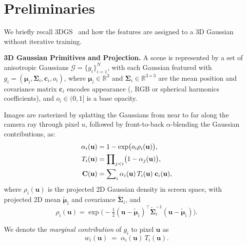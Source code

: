 \section{Preliminaries}
We briefly recall 3DGS~\cite{kerbl20233d} and how the features are assigned to a 3D Gaussian without iterative training.

\textbf{3D Gaussian Primitives and Projection.}
A scene is represented by a set of anisotropic Gaussians $\mathcal{G}=\{g_i\}_{i=1}^N$, with each Gaussian featured with $g_i=(\boldsymbol\mu_i,\mathbf\Sigma_i,\mathbf{c}_i,o_i)$, where $\boldsymbol\mu_i\!\in\!\mathbb{R}^3$ and $\mathbf\Sigma_i\!\in\!\mathbb{R}^{3\times 3}$ are the mean position and covariance matrix $\mathbf{c}_i$ encodes appearance (\eg, RGB or spherical harmonics coefficients), and $o_i\!\in\!(0,1]$ is a base opacity.

Images are rasterized by splatting the Gaussians from near to far along the camera ray through pixel $u$, followed by front-to-back $\alpha$-blending the Gaussian contributions, as:
\begin{align}
\alpha_i(\mathbf{u})
&= 1-\exp\!\big(o_i\rho_i(\mathbf{u})\big),
\label{eq:alpha}
\\
T_i(\mathbf{u})
&= \prod\nolimits_{j<i}\!\big(1-\alpha_j(\mathbf{u})\big),
\hspace{-1em}
\label{eq:transmittance}
\\
\mathbf{C}(\mathbf{u})
&= \sum\nolimits_{i} 
\alpha_i(\mathbf{u})\,T_i(\mathbf{u})
\;\mathbf{c}_i(\mathbf{u}),
\label{eq:composite_color}
\end{align}
where $\rho_i(\mathbf{u})$ is the projected 2D Gaussian density in screen space, with projected 2D mean $\tilde{\boldsymbol\mu}_i$ and covariance $\tilde{\mathbf\Sigma}_i$, and
\begin{equation}
\rho_i(\mathbf{u})
= \exp\!\Big(-\tfrac{1}{2}(\mathbf{u}-\tilde{\boldsymbol\mu}_i)^\top
\tilde{\mathbf\Sigma}_i^{-1}(\mathbf{u}-\tilde{\boldsymbol\mu}_i)\Big).
\end{equation}

We denote the \emph{marginal contribution} of $g_i$ to pixel $\mathbf{u}$ as
\begin{equation}
w_i(\mathbf{u}) \;=\; \alpha_i(\mathbf{u})\,T_i(\mathbf{u}).
\label{eq:weight_def}
\end{equation}


